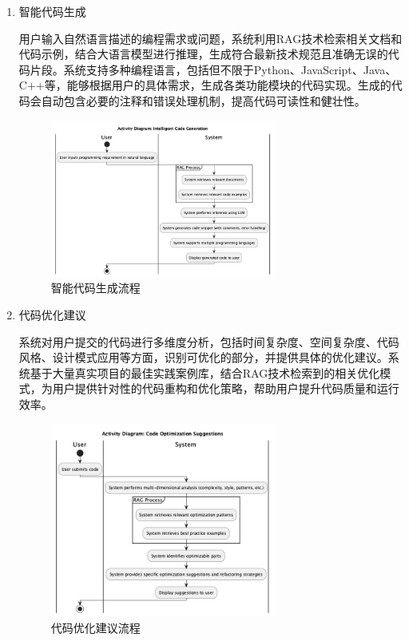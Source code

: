 \documentclass[
    report,     %
    oneside,    %
    UTF8,       %
    zihao=-4    %
]{config} %
\begin{document}
\begin{enumerate}[label=(\arabic*)]
    \item 智能代码生成

    用户输入自然语言描述的编程需求或问题，系统利用RAG技术检索相关文档和代码示例，结合大语言模型进行推理，生成符合最新技术规范且准确无误的代码片段。系统支持多种编程语言，包括但不限于Python、JavaScript、Java、C++等，能够根据用户的具体需求，生成各类功能模块的代码实现。生成的代码会自动包含必要的注释和错误处理机制，提高代码可读性和健壮性。
    \begin{figure}[H]
        \centering
        \includegraphics[width=0.7\textwidth]{UML/Activity/Intelligent-Code-Generation.png}
        \caption{智能代码生成流程}
        \label{fig:IntelligentCodeGeneration}
    \end{figure}
    
    \item 代码优化建议
    
    系统对用户提交的代码进行多维度分析，包括时间复杂度、空间复杂度、代码风格、设计模式应用等方面，识别可优化的部分，并提供具体的优化建议。系统基于大量真实项目的最佳实践案例库，结合RAG技术检索到的相关优化模式，为用户提供针对性的代码重构和优化策略，帮助用户提升代码质量和运行效率。
    \begin{figure}[H]
        \centering
        \includegraphics[width=0.7\textwidth]{UML/Activity/Code-Optimization-Suggestions.png}
        \caption{代码优化建议流程}
        \label{fig:CodeOptimizationSuggestions}
    \end{figure}
    

\end{enumerate}
\end{document}
